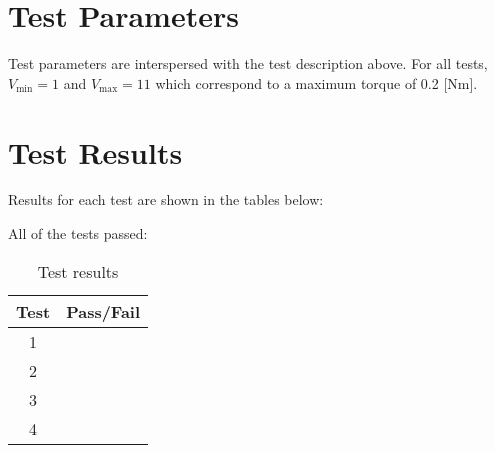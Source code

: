 \section{Test Parameters}
Test parameters are interspersed with the test description above. For all tests, $V_{\mathrm{min}} = 1$ and $V_{\mathrm{max}} = 11$ which correspond to a maximum torque of 0.2 [Nm].

\section{Test Results}
Results for each test are shown in the tables below:





All of the tests passed:
\begin{table}[H]
	\caption{Test results}
	\label{tab:results}
	\centering \fontsize{10}{10}\selectfont
	\begin{tabular}{c | c  } %
		\hline
		\textbf{Test} 						  		&\textbf{Pass/Fail} \\ \hline
	   1	   			&  \\ \hline
		2	   			&  \\ \hline
		3	   			&  \\ \hline
		4	   			&  \\ \hline
	\end{tabular}
\end{table}





\pagebreak %